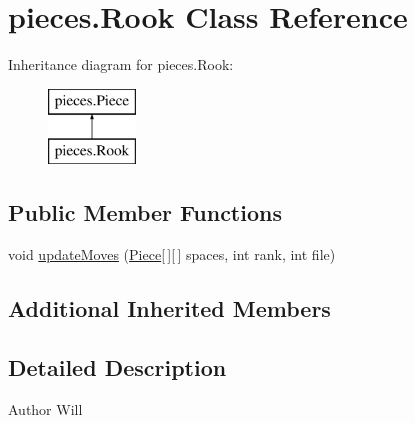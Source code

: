 \hypertarget{classpieces_1_1_rook}{\section{pieces.\-Rook Class Reference}
\label{classpieces_1_1_rook}
}
Inheritance diagram for pieces.\-Rook\-:\begin{figure}[H]
\begin{center}
\leavevmode
\includegraphics[height=2.000000cm]{classpieces_1_1_rook}
\end{center}
\end{figure}
\subsection*{Public Member Functions}
\begin{DoxyCompactItemize}
\item 
void \hyperlink{classpieces_1_1_rook_a4b6c88bd4942a5ff68aab59cc350152e}{update\-Moves} (\hyperlink{classpieces_1_1_piece}{Piece}\mbox{[}$\,$\mbox{]}\mbox{[}$\,$\mbox{]} spaces, int rank, int file)
\end{DoxyCompactItemize}
\subsection*{Additional Inherited Members}


\subsection{Detailed Description}
\begin{DoxyAuthor}{Author}
Will 
\end{DoxyAuthor}


